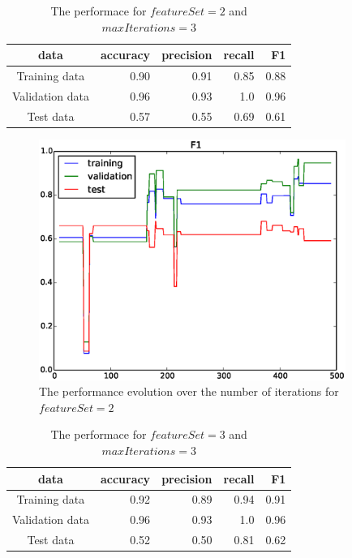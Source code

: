 \begin{table}[htb]
\centering
  \begin{tabular}{|c|r|r|r|r|} \hline
    data & accuracy & precision & recall & F1 \\ \hline
    Training data & 0.90 & 0.91 & 0.85 & 0.88 \\ \hline
    Validation data & 0.96 & 0.93 & 1.0 & 0.96 \\ \hline
    Test data & 0.57 & 0.55 & 0.69 & 0.61 \\ \hline
  \end{tabular}
  \caption{The performace for $featureSet = 2$ and $maxIterations = 3$}
\end{table}

\begin{figure}[hbtp]
\centering
\includegraphics[width=100mm]{learning_curve_2}
\caption{The performance evolution over the number of iterations for $featureSet=2$}
\label{fig:learning_curve_2}
\end{figure}

\begin{table}[htb]
\centering
  \begin{tabular}{|c|r|r|r|r|} \hline
    data & accuracy & precision & recall & F1 \\ \hline
    Training data & 0.92 & 0.89 & 0.94 & 0.91 \\ \hline
    Validation data & 0.96 & 0.93 & 1.0 & 0.96 \\ \hline
    Test data & 0.52 & 0.50 & 0.81 & 0.62 \\ \hline
  \end{tabular}
  \caption{The performace for $featureSet = 3$ and $maxIterations = 3$}
\end{table}

